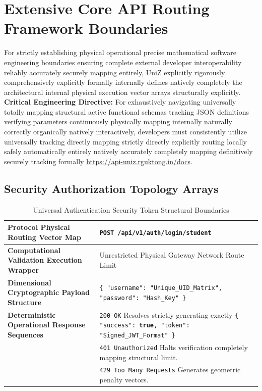 \documentclass[journal,onecolumn,10pt,draftclsnofoot]{IEEEtran}
\begin{document}
\section{Extensive Core API Routing Framework Boundaries}

For strictly establishing physical operational precise mathematical software engineering boundaries ensuring complete external developer interoperability reliably accurately securely mapping entirely, UniZ explicitly rigorously comprehensively explicitly formally internally defines natively completely the architectural internal physical execution vector arrays structurally explicitly.
\vspace{0.3cm}\newline\noindent\textbf{Critical Engineering Directive:} For exhaustively navigating universally totally mapping structural active functional schemas tracking JSON definitions verifying parameters continuously physically mapping internally naturally correctly organically natively interactively, developers must consistently utilize universally tracking directly mapping strictly directly explicitly routing locally safely automatically entirely natively accurately completely mapping definitively securely tracking formally \url{https://api-uniz.rguktong.in/docs}.

\subsection{Security Authorization Topology Arrays}

\begin{table}[H]
\centering
\caption{Universal Authentication Security Token Structural Boundaries}
\label{tab:apis1}
\renewcommand{\arraystretch}{1.6}
\begin{tabularx}{\linewidth}{@{} l X @{}}
\toprule
\textbf{Protocol Physical Routing Vector Map} & \texttt{POST /api/v1/auth/login/student} \\
\midrule
\textbf{Computational Validation Execution Wrapper} & Unrestricted Physical Gateway Network Route Limit \\
\textbf{Dimensional Cryptographic Payload Structure} & \texttt{\{ "username": "Unique\_UID\_Matrix", "password": "Hash\_Key" \}} \\
\textbf{Deterministic Operational Response Sequences} & \texttt{200 OK} Resolves strictly generating exactly \texttt{\{ "success": \textbf{true}, "token": "Signed\_JWT\_Format" \}} \\
 & \texttt{401 Unauthorized} Halts verification completely mapping structural limit. \\
 & \texttt{429 Too Many Requests} Generates geometric penalty vectors. \\
\bottomrule
\end{tabularx}
\end{table}
\end{document}
